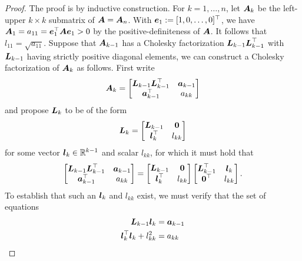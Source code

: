 \begin{proof}
	The proof is by inductive construction. For \(k = 1, \dots, n\), let \(\boldsymbol{A}_k\) be the left-upper \(k \times k\) submatrix of \(\boldsymbol{A} = \boldsymbol{A}_n\). With \(\boldsymbol{e}_1 := [1, 0, \dots, 0]^\top\), we have \(\boldsymbol{A}_1 = a_{11} = \boldsymbol{e}_1^\top \boldsymbol{A} \boldsymbol{e}_1 > 0\) by the positive-definiteness of \(\boldsymbol{A}\). It follows that \(l_{11} = \sqrt{a_{11}}\). Suppose that \(\boldsymbol{A}_{k-1}\) has a Cholesky factorization \(\boldsymbol{L}_{k-1}\boldsymbol{L}_{k-1}^\top\) with \(\boldsymbol{L}_{k-1}\) having strictly positive diagonal elements, we can construct a Cholesky factorization of \(\boldsymbol{A}_k\) as follows. First write
	\begin{equation}
		\label{MatrixAkBlock}
		\boldsymbol{A}_k = \begin{bmatrix} \boldsymbol{L}_{k-1}\boldsymbol{L}_{k-1}^\top & \boldsymbol{a}_{k-1} \\ \boldsymbol{a}_{k-1}^\top & a_{kk} \end{bmatrix}
	\end{equation}
	and propose \(\boldsymbol{L}_k\) to be of the form
	\begin{equation}
		\label{MatrixLkBlock}
		\boldsymbol{L}_k = \begin{bmatrix} \boldsymbol{L}_{k-1} & \boldsymbol{0} \\ \boldsymbol{l}_k^\top & l_{kk} \end{bmatrix}
	\end{equation}
	for some vector \(\boldsymbol{l}_k \in \mathbb{R}^{k-1}\) and scalar \(l_{kk}\), for which it must hold that
	\begin{equation}
		\label{MatrixBlockMultiplication}
		\begin{bmatrix} \boldsymbol{L}_{k-1}\boldsymbol{L}_{k-1}^\top & \boldsymbol{a}_{k-1} \\ \boldsymbol{a}_{k-1}^\top & a_{kk} \end{bmatrix} = \begin{bmatrix} \boldsymbol{L}_{k-1} & \boldsymbol{0} \\ \boldsymbol{l}_k^\top & l_{kk} \end{bmatrix} \begin{bmatrix} \boldsymbol{L}_{k-1}^\top & \boldsymbol{l}_k \\ \boldsymbol{0}^\top & l_{kk} \end{bmatrix}.
	\end{equation}
	To establish that such an \(\boldsymbol{l}_k\) and \(l_{kk}\) exist, we must verify that the set of equations
	\begin{equation}
		\label{CholeskyEquationSystem}
		\begin{aligned}
			\bL_{k-1} \vecb{l}_k                & = \ba_{k-1} \\
			\vecb{l}_k^\T \vecb{l}_k + l_{kk}^2 & = a_{kk}
		\end{aligned}

\end{equation}
\end{proof}
